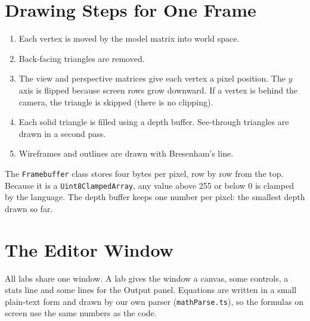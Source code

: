 \section{Drawing Steps for One Frame}
\begin{enumerate}
\item Each vertex is moved by the model matrix into world space.
\item Back-facing triangles are removed.
\item The view and perspective matrices give each vertex a pixel position. The $y$ axis is flipped because screen rows grow downward. If a vertex is behind the camera, the triangle is skipped (there is no clipping).
\item Each solid triangle is filled using a depth buffer. See-through triangles are drawn in a second pass.
\item Wireframes and outlines are drawn with Bresenham's line.
\end{enumerate}
The \texttt{Framebuffer} class stores four bytes per pixel, row by row from the top. Because it is a \texttt{Uint8ClampedArray}, any value above 255 or below 0 is clamped by the language. The depth buffer keeps one number per pixel: the smallest depth drawn so far.

\section{The Editor Window}
All labs share one window. A lab gives the window a canvas, some controls, a stats line and some lines for the Output panel. Equations are written in a small plain-text form and drawn by our own parser (\texttt{mathParse.ts}), so the formulas on screen use the same numbers as the code.
